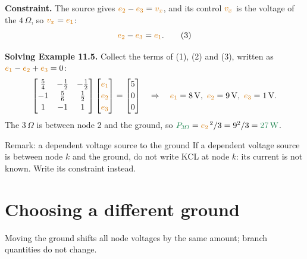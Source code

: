 \documentclass[11pt,a4paper]{article}
\newcommand{\Vcol}[1]{\textcolor{cvolt}{#1}}
\newcommand{\Pcol}[1]{\textcolor{cpow}{#1}}
\newcommand{\uni}[1]{\,\mathrm{#1}}
\newcommand{\W}{\uni{W}}   \newcommand{\J}{\uni{J}}
\newcommand{\ohm}{\,\Omega}
\newcommand{\e}[1]{\textcolor{cvolt}{e_{#1}}}
\begin{document}
\textbf{Constraint.} The source gives $\e{2} - \e{3} = \Vcol{v_x}$, and its control
$\Vcol{v_x}$ is the voltage of the $4\ohm$, so $\Vcol{v_x} = \e{1}$:
\[
  \e{2} - \e{3} = \e{1} . \qquad (3)
\]

\textbf{Solving Example 11.5.} Collect the terms of (1), (2) and (3), written as
$\e{1} - \e{2} + \e{3} = 0$:
\[
  \begin{bmatrix}
    \frac54 & -\frac12 & -\frac12\\[2pt]
    -1 & \frac56 & \frac12\\[2pt]
    1 & -1 & 1
  \end{bmatrix}
  \begin{bmatrix} \e{1}\\[2pt] \e{2}\\[2pt] \e{3} \end{bmatrix}
  = \begin{bmatrix} 5\\[2pt] 0\\[2pt] 0 \end{bmatrix}
  \quad\Rightarrow\quad \e{1} = 8\V, \ \e{2} = 9\V, \ \e{3} = 1\V .
\]
The $3\ohm$ is between node 2 and the ground, so
$\Pcol{P_{3\Omega}} = \e{2}^{\,2}/3 = 9^2/3 = \Pcol{27\W}$.

\begin{definitionbox}{Remark: a dependent voltage source to the ground}
If a dependent voltage source is between node $k$ and the ground, do not write KCL at node $k$:
its current is not known. Write its constraint instead.
\end{definitionbox}

\section{Choosing a different ground}

Moving the ground shifts all node voltages by the same amount; branch quantities do not change.
\end{document}
